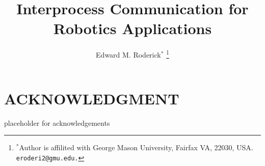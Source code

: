 \documentclass[letterpaper, 10 pt, conference]{ieeeconf}  %
\title{\LARGE \bf Interprocess Communication for Robotics Applications
}
\author{Edward M. Roderick$^{*}$
\thanks{$^{*}$Author is affilited with George Mason University, Fairfax VA, 22030, USA. {\tt\small eroderi2@gmu.edu.}}%
}
\begin{document}
\maketitle
\thispagestyle{empty}
\pagestyle{empty}











\addtolength{\textheight}{-12cm}   %


\section*{ACKNOWLEDGMENT}

placeholder for acknowledgements


\nocite{*}



\end{document}
